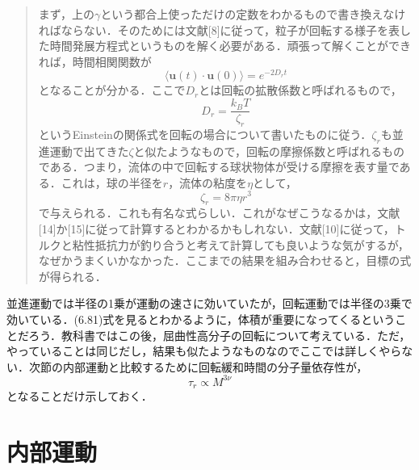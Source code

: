 \documentclass{jsarticle}
\begin{document}
\begin{quote}
\small 
まず，上の$\gamma$という都合上使っただけの定数をわかるもので書き換えなければならない．そのためには文献[8]に従って，粒子が回転する様子を表した時間発展方程式というものを解く必要がある．頑張って解くことができれば，時間相関関数が
\begin{equation}
\langle \bm{u}(t)\cdot \bm{u}(0)\rangle=e^{-2D_r t}
\end{equation}
となることが分かる．ここで$D_r$とは回転の拡散係数と呼ばれるもので，
\begin{equation}
D_r =\frac{k_B T}{\zeta _r}
\end{equation}
というEinsteinの関係式を回転の場合について書いたものに従う．$\zeta _r$も並進運動で出てきた$\zeta$と似たようなもので，回転の摩擦係数と呼ばれるものである．つまり，流体の中で回転する球状物体が受ける摩擦を表す量である．これは，球の半径を$r$，流体の粘度を$\eta$として，
\begin{equation}
\zeta _r =8\pi \eta r^3
\end{equation}
で与えられる．これも有名な式らしい．これがなぜこうなるかは，文献[14]か[15]に従って計算するとわかるかもしれない．文献[10]に従って，トルクと粘性抵抗力が釣り合うと考えて計算しても良いような気がするが，なぜかうまくいかなかった．ここまでの結果を組み合わせると，目標の式が得られる．
\end{quote}
並進運動では半径の1乗が運動の速さに効いていたが，回転運動では半径の3乗で効いている．(6.81)式を見るとわかるように，体積が重要になってくるということだろう．教科書ではこの後，屈曲性高分子の回転について考えている．ただ，やっていることは同じだし，結果も似たようなものなのでここでは詳しくやらない．次節の内部運動と比較するために回転緩和時間の分子量依存性が，
\begin{equation}
\tau _r \propto M^{3\nu}
\end{equation}
となることだけ示しておく．

\section{内部運動}
\end{document}
